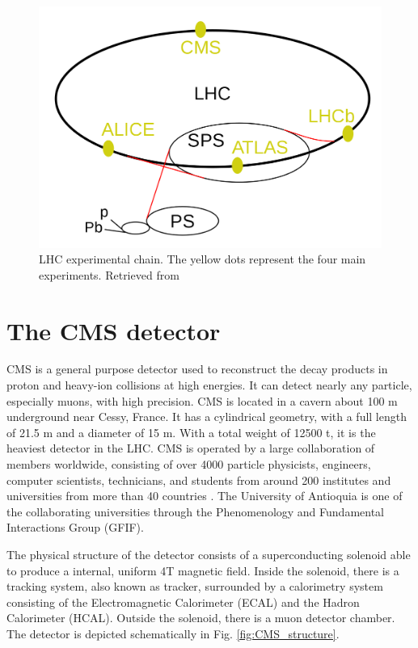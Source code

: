 \begin{figure}[htp!]
	\centering
	\includegraphics[scale=0.3]{MainContent/Figs/LHC.png}
	\caption{LHC experimental chain. The yellow dots represent the four main experiments. Retrieved from \cite{nobrega2013lhc}}
	\label{fig:LHC}
\end{figure}

\section{The CMS detector}

CMS is a general purpose detector used to reconstruct the decay products in proton and heavy-ion collisions at high energies. It can detect nearly any particle, especially muons, with high precision. CMS is located in a cavern about 100 m underground near Cessy, France. It has a cylindrical geometry, with a full length of 21.5 m and a diameter of 15 m. With a total weight of 12500 t, it is the heaviest detector in the LHC. CMS is operated by a large collaboration of members worldwide, consisting of over 4000 particle physicists, engineers, computer scientists, technicians, and students from around 200 institutes and universities from more than 40 countries \cite{cms_collab}. The University of Antioquia is one of the collaborating universities through the Phenomenology and Fundamental Interactions Group (GFIF).

The physical structure of the detector consists of a superconducting solenoid able to produce a internal, uniform 4T magnetic field. Inside the solenoid, there is a tracking system, also known as tracker, surrounded by a calorimetry system consisting of the Electromagnetic Calorimeter (ECAL) and the Hadron Calorimeter (HCAL). Outside the solenoid, there is a muon detector chamber. The detector is depicted schematically in Fig. \ref{fig:CMS_structure}.

